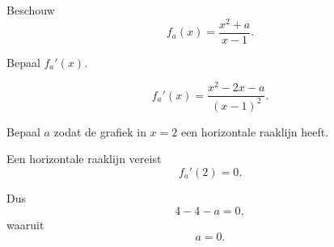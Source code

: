 \documentclass{ximera}
\begin{document}
\begin{oefening}{\oefU\ESS}

Beschouw
\[
f_a(x)=\frac{x^2+a}{x-1}.
\]

\begin{question}
Bepaal $f_a'(x)$.

\begin{oplossing}
\[
f_a'(x)
=
\frac{x^2-2x-a}{(x-1)^2}.
\]
\end{oplossing}
\end{question}


\begin{question}
Bepaal $a$ zodat de grafiek in $x=2$ een horizontale raaklijn heeft.

\begin{oplossing}
Een horizontale raaklijn vereist
\[
f_a'(2)=0.
\]

Dus
\[
4-4-a=0,
\]
waaruit
\[
\boxed{a=0}.
\]
\end{oplossing}
\end{question}

\end{oefening}


\end{document}
